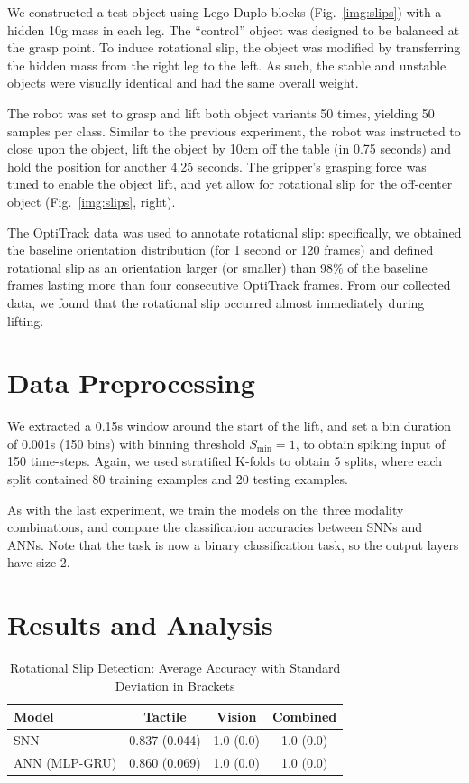 \documentclass[fyp]{socreport}
\begin{document}
We constructed a test object using Lego Duplo blocks (Fig.~\ref{img:slips}) with
a hidden 10g mass in each leg. The ``control'' object was designed to be
balanced at the grasp point. To induce rotational slip, the object was modified
by transferring the hidden mass from the right leg to the left. As such, the
stable and unstable objects were visually identical and had the same overall
weight.

The robot was set to grasp and lift both object variants 50 times, yielding 50
samples per class. Similar to the previous experiment, the robot was instructed
to close upon the object, lift the object by 10cm off the table (in 0.75
seconds) and hold the position for another 4.25 seconds. The gripper's grasping
force was tuned to enable the object lift, and yet allow for rotational slip for
the off-center object (Fig.~\ref{img:slips}, right).

The OptiTrack data was used to annotate rotational slip: specifically, we
obtained the baseline orientation distribution (for 1 second or 120 frames) and
defined rotational slip as an orientation larger (or smaller) than 98\% of the
baseline frames lasting more than four consecutive OptiTrack frames. From our
collected data, we found that the rotational slip occurred almost immediately
during lifting.

\section{Data Preprocessing}

We extracted a 0.15s window around the start of the lift, and set a bin duration
of 0.001s (150 bins) with binning threshold $S_\text{min} = 1$, to obtain
spiking input of 150 time-steps. Again, we used stratified K-folds to obtain 5
splits, where each split contained 80 training examples and 20 testing examples.

As with the last experiment, we train the models on the three modality
combinations, and compare the classification accuracies between SNNs and ANNs.
Note that the task is now a binary classification task, so the output layers
have size 2.

\section{Results and Analysis}

\begin{table}
\centering
\caption{Rotational Slip Detection: Average Accuracy with Standard Deviation in
  Brackets\label{tbl:sdacc}}
\begin{tabular}{lccc}
 \toprule
  \textbf{Model} & \textbf{Tactile} & \textbf{Vision} & \textbf{Combined} \\
 \midrule
 SNN & 0.837 (0.044)  & 1.0 (0.0) & 1.0 (0.0) \\
 ANN (MLP-GRU) & 0.860 (0.069) & 1.0 (0.0)  & 1.0 (0.0) \\
 \bottomrule
\end{tabular}
\end{table}
\end{document}
